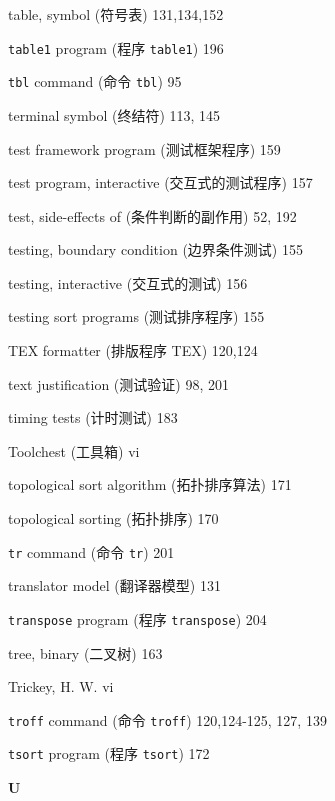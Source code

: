 \begin{multicols}{2}
\hangindent=2pc  table, symbol (符号表) 131,134,152

\hangindent=2pc  \verb'table1' program (程序 \verb'table1') 196

\hangindent=2pc  \verb'tbl' command (命令 \verb'tbl') 95

\hangindent=2pc  terminal symbol (终结符) 113, 145

\hangindent=2pc  test framework program (测试框架程序) 159

\hangindent=2pc  test program, interactive (交互式的测试程序) 157

\hangindent=2pc  test, side-effects of (条件判断的副作用) 52, 192

\hangindent=2pc  testing, boundary condition (边界条件测试) 155

\hangindent=2pc  testing, interactive (交互式的测试) 156

\hangindent=2pc  testing sort programs (测试排序程序) 155

\hangindent=2pc  TEX formatter (排版程序 TEX) 120,124

\hangindent=2pc  text justification (测试验证) 98, 201

\hangindent=2pc  timing tests (计时测试) 183

\hangindent=2pc  Toolchest (工具箱) vi

\hangindent=2pc  topological sort algorithm (拓扑排序算法) 171

\hangindent=2pc  topological sorting (拓扑排序) 170

\hangindent=2pc  \verb'tr' command (命令 \verb'tr') 201

\hangindent=2pc  translator model (翻译器模型) 131

\hangindent=2pc  \verb'transpose' program (程序
\verb'transpose') 204

\hangindent=2pc  tree, binary (二叉树) 163

\hangindent=2pc  Trickey, H. W. vi

\hangindent=2pc  \verb'troff' command (命令 \verb'troff')
120,124-125, 127, 139

\hangindent=2pc  \verb'tsort' program (程序 \verb'tsort') 172

\medskip\textbf{\large{U}}


\end{multicols}

